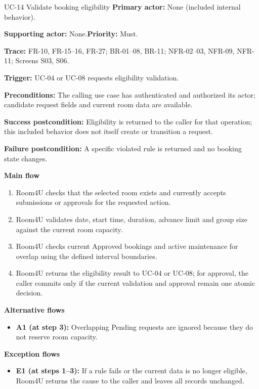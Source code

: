 \begin{usecasebox}{UC-14 Validate booking eligibility}
\noindent\textbf{Primary actor:} None (included internal behavior).\par
\textbf{Supporting actor:} None.\quad\textbf{Priority:} Must.\par
\textbf{Trace:} FR-10, FR-15--16, FR-27; BR-01--08, BR-11; NFR-02--03, NFR-09, NFR-11; Screens S03, S06.\par
\textbf{Trigger:} UC-04 or UC-08 requests eligibility validation.\par
\textbf{Preconditions:} The calling use case has authenticated and authorized its actor; candidate request fields and current room data are available.\par
\textbf{Success postcondition:} Eligibility is returned to the caller for that operation; this included behavior does not itself create or transition a request.\par
\textbf{Failure postcondition:} A specific violated rule is returned and no booking state changes.\par
\textbf{Main flow}
\begin{enumerate}[label=\arabic*.,leftmargin=2em,itemsep=1pt,topsep=2pt]
  \item Room4U checks that the selected room exists and currently accepts submissions or approvals for the requested action.
  \item Room4U validates date, start time, duration, advance limit and group size against the current room capacity.
  \item Room4U checks current Approved bookings and active maintenance for overlap using the defined interval boundaries.
  \item Room4U returns the eligibility result to UC-04 or UC-08; for approval, the caller commits only if the current validation and approval remain one atomic decision.
\end{enumerate}
\textbf{Alternative flows}
\begin{itemize}[label={},leftmargin=0pt,itemsep=1pt,topsep=1pt]
  \item \textbf{A1 (at step 3):} Overlapping Pending requests are ignored because they do not reserve room capacity.
\end{itemize}
\textbf{Exception flows}
\begin{itemize}[label={},leftmargin=0pt,itemsep=1pt,topsep=1pt]
  \item \textbf{E1 (at steps 1--3):} If a rule fails or the current data is no longer eligible, Room4U returns the cause to the caller and leaves all records unchanged.
\end{itemize}
\end{usecasebox}